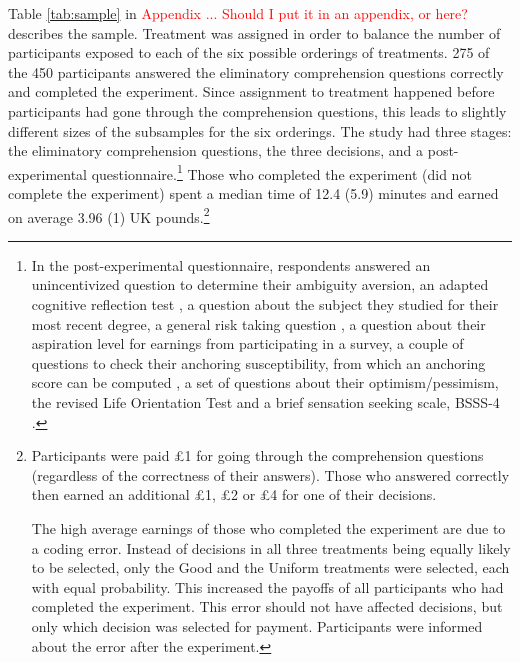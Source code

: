 Table \ref{tab:sample} in \textcolor{red}{Appendix ... Should I put it in an appendix, or here?} describes the sample.
Treatment was assigned in order to balance the number of participants exposed to each of the six possible orderings of treatments.
275 of the 450 participants answered the eliminatory comprehension questions correctly and completed the experiment.
Since assignment to treatment happened before participants had gone through the comprehension questions, this leads to slightly different sizes of the subsamples for the six orderings.
The study had three stages: the eliminatory comprehension questions, the three decisions, and a post-experimental questionnaire.\footnote{
In the post-experimental questionnaire, respondents answered an unincentivized question to determine their ambiguity aversion, an adapted cognitive reflection test \citep{Frederick2005,Thomson2016}, a question about the subject they studied for their most recent degree, a general risk taking question \citep{Dohmen2011}, a question about their aspiration level for earnings from participating in a survey, a couple of questions to check their anchoring susceptibility, from which an anchoring score can be computed \citep{Cheek2017}, a set of questions about their optimism/pessimism, the revised Life Orientation Test \citep{Scheier1994} and a brief sensation seeking scale, BSSS-4 \citep{Stephenson2003}.
}
Those who completed the experiment (did not complete the experiment) spent a median time of 12.4 (5.9) minutes and earned on average 3.96 (1) UK pounds.\footnote{
Participants were paid \pounds1 for going through the comprehension questions (regardless of the correctness of their answers).
Those who answered correctly then earned an additional \pounds1, \pounds2 or \pounds4 for one of their decisions.

The high average earnings of those who completed the experiment are due to a coding error.
Instead of decisions in all three treatments being equally likely to be selected, only the Good and the Uniform treatments were selected, each with equal probability.
This increased the payoffs of all participants who had completed the experiment.
This error should not have affected decisions, but only which decision was selected for payment.
Participants were informed about the error after the experiment.
}



